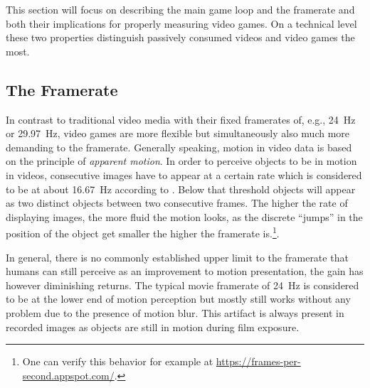 This section will focus on describing the main game loop and the framerate and both their implications for properly measuring video games. On a technical level these two properties distinguish passively consumed videos and video games the most.


\subsection{The Framerate}
\label{sec:framerate}

In contrast to traditional video media with their fixed framerates of, e.g., \SI{24}{\hertz} or \SI{29.97}{\hertz}, video games are more flexible but simultaneously also much more demanding to the framerate. Generally speaking, motion in video data is based on the principle of \textit{apparent motion}. In order to perceive objects to be in motion in videos, consecutive images have to appear at a certain rate which is considered to be at about \SI{16.67}{\hertz} according to \cite{wertheimer1912experimentelle}. Below that threshold objects will appear as two distinct objects between two consecutive frames. %
The higher the rate of displaying images, the more fluid the motion looks, as the discrete ``jumps'' in the position of the object get smaller the higher the framerate is.\footnote{One can verify this behavior for example at \url{https://frames-per-second.appspot.com/}.}.

In general, there is no commonly established upper limit to the framerate that humans can still perceive as an improvement to motion presentation, the gain has however diminishing returns. The typical movie framerate of \SI{24}{\hertz} is considered to be at the lower end of motion perception but mostly still works without any problem due to the presence of motion blur. This artifact is always present in recorded images as objects are still in motion during film exposure. %


